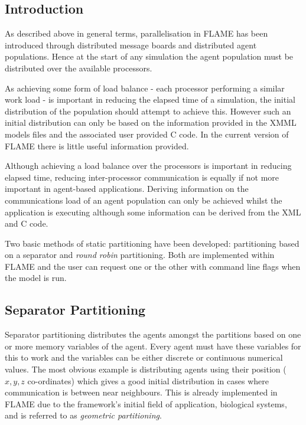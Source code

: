 \subsection{Introduction}

As described above in general terms, parallelisation in FLAME has been introduced through distributed message boards and distributed agent populations. Hence at the start of any simulation the agent population must be distributed over the available processors.

As achieving some form of load balance - each processor performing a similar work load - is important in reducing the elapsed time of a simulation, the initial distribution of the population should attempt to achieve this. However such an initial distribution can only be based on the information provided in the XMML models files and the associated user provided C code. In the current version of FLAME there is little useful information provided.

Although achieving a load balance over the processors is important in reducing elapsed time, reducing inter-processor communication is equally if not more important in agent-based applications. Deriving information on the communications load of an agent population can only be achieved whilst the application is executing although some information can be derived from the XML and C code.

Two basic methods of static partitioning have been developed: partitioning based on a separator and \textsl{round robin} partitioning. Both are implemented within FLAME and the user can request one or the other with command line flags when the model is run.

\subsection{Separator Partitioning}

Separator partitioning distributes the agents amongst the partitions based on one or more memory variables of the agent. Every agent must have these variables for this to work and the variables can be either discrete or continuous numerical values. The most obvious example is distributing agents using their position ($x,y, z$ co-ordinates) which gives a good initial distribution in cases where communication is between near neighbours. This is already implemented in FLAME due to the framework's initial field of application, biological systems, and is referred to as \textit{geometric partitioning}. 

